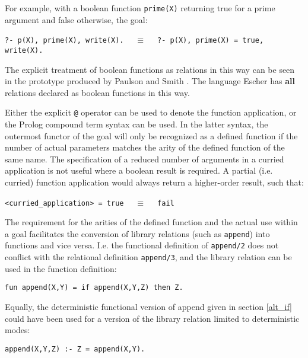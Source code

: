 For example, with a boolean function \texttt{prime(X)} returning true for
a prime argument and false otherwise, the goal:\\
\centerline{\texttt{?- p(X), prime(X), write(X).~~} $\equiv$
\texttt{~~?- p(X), prime(X) = true, write(X).}}

The explicit treatment of boolean functions as relations
in this way can be seen in the prototype
produced by Paulson and Smith \cite{PS91}.
The language Escher \cite{Llo94}
has \textbf{all} relations declared as boolean functions in this way.

Either the explicit \texttt{@} operator can be used to
denote the function application, or the Prolog compound term syntax can
be used.  In the latter syntax, the outermost functor of the goal will
only be recognized as a defined function if the number of actual parameters
matches the arity of the defined function of the same name.  The specification
of a reduced number of arguments in a curried application is not useful where
a boolean result is required.  A partial (i.e. curried) function application
would always return a higher-order result, such that:\\
\centerline{\texttt{<curried\_{}application> = true~~} $\equiv$ \texttt{~~fail}}

The requirement for the arities of the defined function and the actual use within
a goal
facilitates the conversion of library relations (such as \texttt{append}) into
functions and vice versa.  I.e. the functional definition of \texttt{append/2}
does not conflict with the relational definition \texttt{append/3}, and the
library relation can be used in the function definition:
\begin{verbatim}
fun append(X,Y) = if append(X,Y,Z) then Z.
\end{verbatim}
Equally, the deterministic functional version of append
given in section \ref{alt_if} could have been used for a
version of the library relation limited to deterministic modes:
\begin{verbatim}
append(X,Y,Z) :- Z = append(X,Y).
\end{verbatim}


